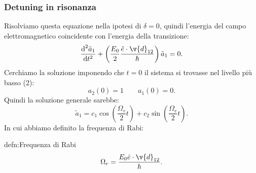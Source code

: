 \subsubsection{Detuning in risonanza}%
Risolviamo questa equazione nella ipotesi di $\delta =0$, quindi l'energia del campo elettromagnetico coincidente con l'energia della transizione:
\[
    \frac{\text{d}^2 \tilde{a}_1}{\text{d} t^2} 
    + \left(\frac{E_0}{2}\frac{\hat{e}\cdot \v{d}_{12}}{\hbar }\right)
    \tilde{a}_1=0
.\] 
Cerchiamo la soluzione imponendo che $t=0$ il sistema si trovasse nel livello più basso (2): 
\[
    a_2(0) = 1 \qquad
    a_1(0) = 0
.\] 
Quindi la soluzione generale sarebbe:
\[
    \tilde{a}_1 = c_1 \cos\left(\frac{\Omega_r}{2}t\right) 
    + c_2 \sin\left(\frac{\Omega_r}{2}t\right)
.\] 
In cui abbiamo definito la frequenza di Rabi:
\begin{defn}{defn:Frequenza di Rabi}
\[
  \Omega_r = \frac{E_0 \hat{e}\cdot \v{d}_{12}}{\hbar }  
.\] 
\end{defn}

